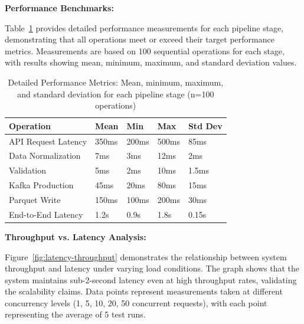 \documentclass[12pt,a4paper]{article}
\begin{document}
\textbf{Performance Benchmarks:}

Table~\ref{tab:performance} provides detailed performance measurements for each pipeline stage, demonstrating that all operations meet or exceed their target performance metrics. Measurements are based on 100 sequential operations for each stage, with results showing mean, minimum, maximum, and standard deviation values.

\begin{table}[H]
\centering
\begin{tabular}{|l|l|l|l|l|}
\hline
\textbf{Operation} & \textbf{Mean} & \textbf{Min} & \textbf{Max} & \textbf{Std Dev} \\
\hline
API Request Latency & 350ms & 200ms & 500ms & 85ms \\
Data Normalization & 7ms & 3ms & 12ms & 2ms \\
Validation & 5ms & 2ms & 10ms & 1.5ms \\
Kafka Production & 45ms & 20ms & 80ms & 15ms \\
Parquet Write & 150ms & 100ms & 200ms & 30ms \\
End-to-End Latency & 1.2s & 0.9s & 1.8s & 0.15s \\
\hline
\end{tabular}
\caption{Detailed Performance Metrics: Mean, minimum, maximum, and standard deviation for each pipeline stage (n=100 operations)}
\label{tab:performance}
\end{table}

\textbf{Throughput vs. Latency Analysis:}

Figure~\ref{fig:latency-throughput} demonstrates the relationship between system throughput and latency under varying load conditions. The graph shows that the system maintains sub-2-second latency even at high throughput rates, validating the scalability claims. Data points represent measurements taken at different concurrency levels (1, 5, 10, 20, 50 concurrent requests), with each point representing the average of 5 test runs.
\end{document}
